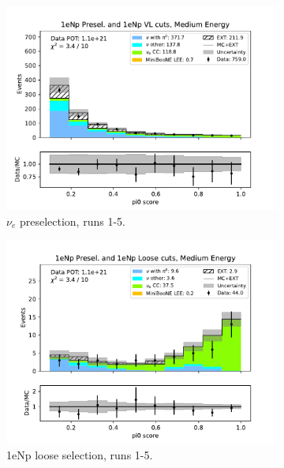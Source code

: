 \begin{figure}[H]
\begin{subfigure}{0.33\linewidth}
        \includegraphics[width=\linewidth]{technote/Sidebands/Figures/NearSideband/near_sideband_pi0_score_run1234b4c4d5_NP_NP_MEDIUM_ENERGY.pdf}
        \caption{$\nu_e$ preselection, runs 1-5.}
    \end{subfigure}%
    \begin{subfigure}{0.33\linewidth}
        \includegraphics[width=\linewidth]{technote/Sidebands/Figures/NearSideband/near_sideband_pi0_score_run1234b4c4d5_NP_NPL_MEDIUM_ENERGY.pdf}
        \caption{1eNp loose selection, runs 1-5.}
    \end{subfigure}%
    \begin{subfigure}{0.33\linewidth}

\end{subfigure}
\end{figure}
